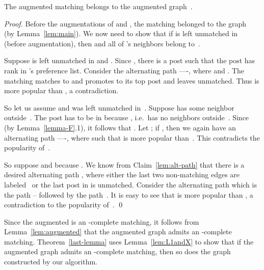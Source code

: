 \documentclass[11pt]{llncs}
\begin{document}
\begin{lemma}
\label{lem:augmented}
The augmented matching  belongs to the augmented graph~.
\end{lemma}
\begin{proof}
Before the augmentations of  and , the matching  belonged to the graph~ (by Lemma~\ref{lem:main}). We now need to 
show that if  is left unmatched in  (before augmentation), then  and all of 's neighbors belong to~.

Suppose  is left unmatched in  and . 
Since , there is a post  such that the post  has rank  in 
's preference list. Consider the alternating path ----, where 
 and . The matching  matches  to  and promotes
 to its top post  and leaves  unmatched.
Thus  is more popular than , a contradiction.

So let us assume  and  was left unmatched in~. Suppose  has some neighbor  outside~. 
The post  has to be in  because , i.e.\  has no neighbors outside~. 
Since  (by Lemma~\ref{lemma-F}.1), it follows that . Let ; if 
, then we again have an alternating path ----, 
where  such that  is more popular than~.
This contradicts the popularity of~.

So suppose   and  because . We know from 
Claim~\ref{lem:alt-path} that there is a desired alternating path , where
either the last two non-matching edges are labeled~ or the last post in  
is unmatched. 
Consider the alternating path  which is the path -- followed by the path~. 
It is easy to see that  is more popular than , 
a contradiction to the popularity of~. \qed
\end{proof}

Since the augmented  is an -complete matching, it follows from Lemma~\ref{lem:augmented} 
that the augmented graph  admits an -complete matching. 
Theorem~\ref{last-lemma} uses Lemma~\ref{lem:L1andX} to show that if the augmented graph  
admits an -complete matching, then so does the graph  constructed by our algorithm. 
\end{document}
